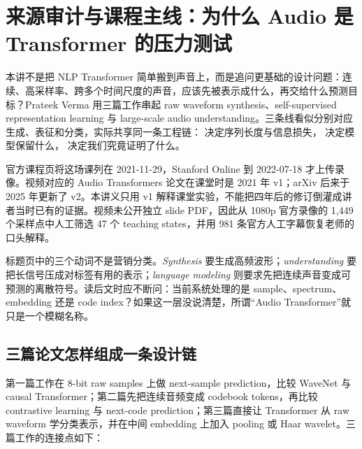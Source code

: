 \section{来源审计与课程主线：为什么 Audio 是 Transformer 的压力测试}

本讲不是把 NLP Transformer 简单搬到声音上，而是追问更基础的设计问题：连续、高采样率、跨多个时间尺度的声音，应该先被表示成什么，再交给什么预测目标？Prateek Verma 用三篇工作串起 raw waveform synthesis、self-supervised representation learning 与 large-scale audio understanding。三条线看似分别对应生成、表征和分类，实际共享同一条工程链： 决定序列长度与信息损失， 决定模型保留什么， 决定我们究竟证明了什么。

官方课程页将这场课列在 2021-11-29，Stanford Online 到 2022-07-18 才上传录像。视频对应的 Audio Transformers 论文在课堂时是 2021 年 v1；arXiv 后来于 2025 年更新了 v2。本讲义只用 v1 解释课堂实验，不能把四年后的修订倒灌成讲者当时已有的证据。视频未公开独立 slide PDF，因此从 1080p 官方录像的 1,449 个采样点中人工筛选 47 个 teaching states，并用 981 条官方人工字幕恢复老师的口头解释。


标题页中的三个动词不是营销分类。\emph{Synthesis} 要生成高频波形；\emph{understanding} 要把长信号压成对标签有用的表示；\emph{language modeling} 则要求先把连续声音变成可预测的离散符号。读后文时应不断问：当前系统处理的是 sample、spectrum、embedding 还是 code index？如果这一层没说清楚，所谓“Audio Transformer”就只是一个模糊名称。


\subsection{三篇论文怎样组成一条设计链}

第一篇工作在 8-bit raw samples 上做 next-sample prediction，比较 WaveNet 与 causal Transformer；第二篇先把连续音频变成 codebook tokens，再比较 contrastive learning 与 next-code prediction；第三篇直接让 Transformer 从 raw waveform 学分类表示，并在中间 embedding 上加入 pooling 或 Haar wavelet。三篇工作的连接点如下：


